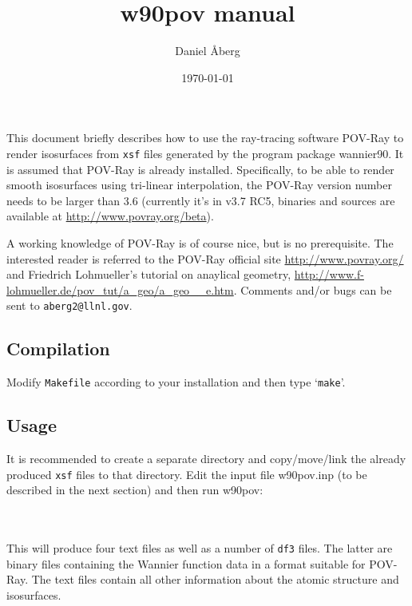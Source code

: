 \documentclass[
  notitlepage,
  twoside,
   prb,
  floatfix,
]{revtex4-1}
\begin{document}
 \title{ 
 w90pov manual
}        
\author{Daniel \AA{}berg}
\date{\today}

\maketitle
This document briefly describes how to use the ray-tracing software \textsf{POV-Ray} to render isosurfaces from {\tt xsf} files generated by the program package \textsf{wannier90}. It is assumed that \textsf{POV-Ray} is already installed. Specifically, to be able to render smooth isosurfaces using tri-linear interpolation, the \textsf{POV-Ray} version number needs to be larger than 3.6 (currently it's in v3.7 RC5, binaries and sources are available at \url{http://www.povray.org/beta}). 

A working knowledge of \textsf{POV-Ray} is of course nice, but is no prerequisite. The interested reader is referred to the  \textsf{POV-Ray} official site \url{http://www.povray.org/} and Friedrich Lohmueller's tutorial on anaylical geometry, \url{http://www.f-lohmueller.de/pov_tut/a_geo/a_geo__e.htm}. Comments and/or bugs can be sent to {\tt aberg2@llnl.gov}. 

\subsection*{Compilation}
Modify {\tt Makefile} according to your installation and then type `{\tt make}'.

\subsection*{Usage}
It is recommended to create a separate directory and copy/move/link the already produced {\tt xsf} files to that directory. Edit the input file \textsf{w90pov.inp} (to be described in the next section) and then run \textsf{w90pov}:

\mbox{}\\
\mbox{}\\

This will produce four text files as well as a number of {\tt df3} files. The latter are binary files containing the Wannier function data in a format suitable for \textsf{POV-Ray}. The text files contain all other information about the atomic structure and isosurfaces.
\end{document}
